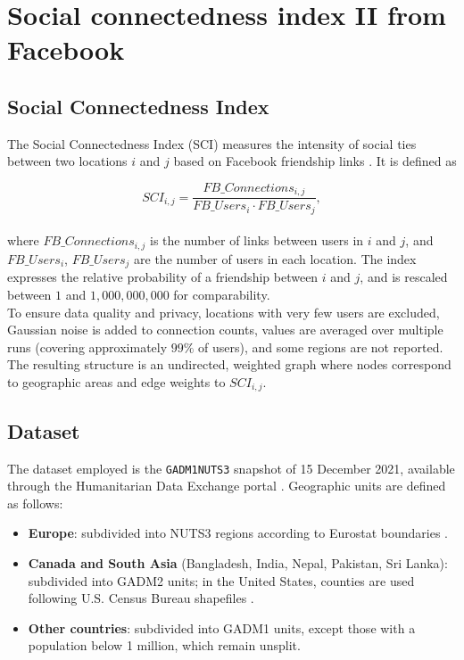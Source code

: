 \chapter{Social connectedness index II from Facebook}


\section{Social Connectedness Index}
The Social Connectedness Index (SCI) measures the intensity of social ties between two locations $i$ and $j$ based on Facebook friendship links \cite{facebookSCI}. It is defined as

\begin{equation}
    SCI_{i,j} = \frac{FB\_Connections_{i,j}}{FB\_Users_i \cdot FB\_Users_j},
\end{equation}\\
where $FB\_Connections_{i,j}$ is the number of links between users in $i$ and $j$, and $FB\_Users_i$, $FB\_Users_j$ are the number of users in each location.  
The index expresses the relative probability of a friendship between $i$ and $j$, and is rescaled between $1$ and $1{,}000{,}000{,}000$ for comparability.  \\
To ensure data quality and privacy, locations with very few users are excluded, Gaussian noise is added to connection counts, values are averaged over multiple runs (covering approximately $99\%$ of users), and some regions are not reported.  
The resulting structure is an undirected, weighted graph where nodes correspond to geographic areas and edge weights to $SCI_{i,j}$.

\section{Dataset}
The dataset employed is the \texttt{GADM1NUTS3} snapshot of 15 December 2021, available through the Humanitarian Data Exchange portal \cite{gadm1nuts3countiescsv}.  
Geographic units are defined as follows:  
\begin{itemize}
    \item \textbf{Europe}: subdivided into NUTS3 regions according to Eurostat boundaries \cite{eurostatNUTS}.  
    \item \textbf{Canada and South Asia} (Bangladesh, India, Nepal, Pakistan, Sri Lanka): subdivided into GADM2 units; in the United States, counties are used following U.S. Census Bureau shapefiles \cite{uscensusCounties}.  
    \item \textbf{Other countries}: subdivided into GADM1 units, except those with a population below 1 million, which remain unsplit.  
\end{itemize}

